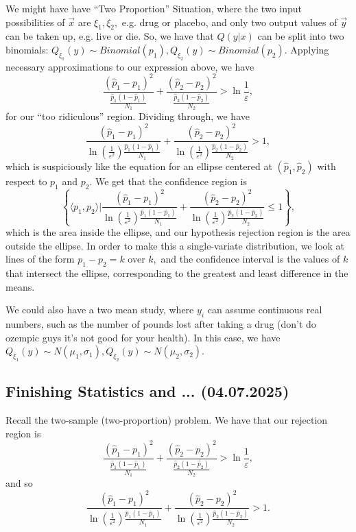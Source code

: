 \documentclass[12pt]{article}
\theoremstyle{remark}
\begin{document}
We might have have ``Two Proportion'' Situation, where the two input possibilities of $\vec{x}$ are $\xi_1,\xi_2,$ e.g. drug or placebo, and only two output values of $\vec{y}$ can be taken up, e.g. live or die. So, we have that $Q(y|x)$ can be split into two binomials: $Q_{\xi_1}(y)\sim Binomial(p_1),Q_{\xi_2}(y)\sim Binomial(p_2).$ Applying necessary approximations to our expression above, we have
\[\frac{(\hat p_1-p_1)^2}{\frac{\hat p_1(1-\hat p_1)}{N_1}}+\frac{(\hat p_2-p_2)^2}{\frac{\hat p_2(1-\hat p_2)}{N_2}}>\ln \frac{1}{\varepsilon},\] for our ``too ridiculous'' region. Dividing through, we have
\[\frac{(\hat p_1-p_1)^2}{\ln\left(\frac{1}{\varepsilon^2}\right)\frac{\hat p_1(1-\hat p_1)}{N_1}}+\frac{(\hat p_2-p_2)^2}{\ln\left(\frac{1}{\varepsilon^2}\right)\frac{\hat p_2(1-\hat p_2)}{N_2}}>1,\] which is suspiciously like the equation for an ellipse centered at $(\hat p_1,\hat p_2)$ with respect to $p_1$ and $p_2.$ We get that the confidence region is
\[\left\{\langle p_1,p_2\rangle\Bigg\vert\frac{(\hat p_1-p_1)^2}{\ln\left(\frac{1}{\varepsilon^2}\right)\frac{\hat p_1(1-\hat p_1)}{N_1}}+\frac{(\hat p_2-p_2)^2}{\ln\left(\frac{1}{\varepsilon^2}\right)\frac{\hat p_2(1-\hat p_2)}{N_2}}\le 1\right\},\] which is the area inside the ellipse, and our hypothesis rejection region is the area outside the ellipse. In order to make this a single-variate distribution, we look at lines of the form $p_1-p_2=k$ over $k,$ and the confidence interval is the values of $k$ that intersect the ellipse, corresponding to the greatest and least difference in the means.

We could also have a two mean study, where $y_i$ can assume continuous real numbers, such as the number of pounds lost after taking a drug (don't do ozempic guys it's not good for your health). In this case, we have $Q_{\xi_1}(y)\sim N(\mu_1,\sigma_1),Q_{\xi_2}(y)\sim N(\mu_2,\sigma_2).$

\subsection{Finishing Statistics and ... (04.07.2025)}
Recall the two-sample (two-proportion) problem. We have that our rejection region is
\[\frac{(\hat p_1-p_1)^2}{\frac{\hat p_1(1-\hat p_1)}{N_1}}+\frac{(\hat p_2-p_2)^2}{\frac{\hat p_2(1-\hat p_2)}{N_2}}>\ln \frac{1}{\varepsilon},\]
and so 
\[\frac{(\hat p_1-p_1)^2}{\ln\left(\frac{1}{\varepsilon^2}\right)\frac{\hat p_1(1-\hat p_1)}{N_1}}+\frac{(\hat p_2-p_2)^2}{\ln\left(\frac{1}{\varepsilon^2}\right)\frac{\hat p_2(1-\hat p_2)}{N_2}}>1.\]
\end{document}
